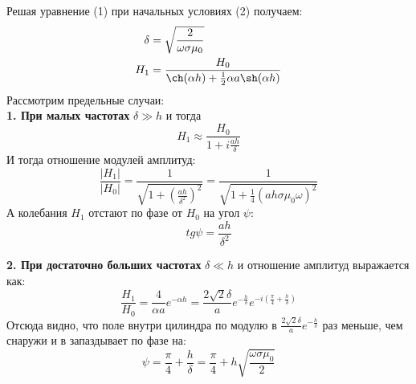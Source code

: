 Решая уравнение (1) при начальных условиях (2) получаем:
\begin{align}
    \delta &= \sqrt{\frac{2}{\omega \sigma \mu_0}}\label{eq:delta}\\ 
    H_1 &= \frac{H_0}{\ch (\alpha h) + \frac{1}{2}\alpha a\sh(\alpha h)}
\end{align}
Рассмотрим предельные случаи:\\ 
\indent \textbf{1. При малых частотах} $\delta \gg h$ и тогда 
\begin{equation}
    H_1 \approx \frac{H_0}{1 + i\frac{a h}{\delta}}
\end{equation}
И тогда отношение модулей амплитуд:
\begin{equation}
    \frac{|H_1|}{|H_0|} = \frac{1}{\sqrt{1 + \left (\frac{a h}{\delta^2}\right )^2}} = \frac{1}{\sqrt{1 + \frac{1}{4}(a h \sigma \mu_0 \omega)^2}} \label{eq::Hrelation}
\end{equation}
А колебания $H_1$ отстают по фазе от $H_0$ на угол $\psi$:
\begin{equation}
    tg\psi = \frac{a h}{\delta^2} \label{eq:tgpsi}
\end{equation}

\indent \textbf{2. При достаточно больших частотах} $\delta \ll h$ и отношение амплитуд выражается как:
\begin{equation}
    \frac{H_1}{H_0} = \frac{4}{\alpha a}e^{-\alpha h} = \frac{2\sqrt{2}\delta}{a}e^{-\frac{h}{\delta}}e^{-i\left( \frac{\pi}{4} + \frac{h}{\delta}\right)}
\end{equation}
Отсюда видно, что поле внутри цилиндра по модулю в $\frac{2\sqrt{2}\delta}{a}e^{-\frac{h}{\delta}}$ раз меньше, чем снаружи и в запаздывает по фазе на:
\begin{equation}
    \psi = \frac{\pi}{4} + \frac{h}{\delta} = \frac{\pi}{4} + h\sqrt{\frac{\omega\sigma\mu_0}{2}} \label{eq:psi}
\end{equation}

